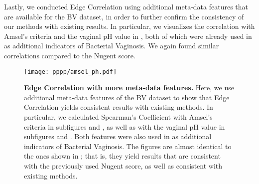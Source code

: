 Lastly, we conducted Edge Correlation using additional meta-data features that are available for the \ac{BV} dataset,
in order to further confirm the consistency of our methods with existing results.
In particular, we visualizes the correlation with Amsel's criteria \cite{Amsel1983} and the vaginal pH value
in , both of which were already used in \cite{Srinivasan2012} as additional indicators of Bacterial Vaginosis.
We again found similar correlations compared to the Nugent score.


\begin{figure}[!hpbt]
    \centering
    \texttt{[image: pppp/amsel\_ph.pdf]}
    \begin{subfigure}{0pt}
        \label{fig:amsel_ph:sub:amsel_em}
    \end{subfigure}
    \begin{subfigure}{0pt}
        \label{fig:amsel_ph:sub:amsel_ei}
    \end{subfigure}
    \begin{subfigure}{0pt}
        \label{fig:amsel_ph:sub:ph_em}
    \end{subfigure}
    \begin{subfigure}{0pt}
        \label{fig:amsel_ph:sub:ph_ei}
    \end{subfigure}
    \caption[Edge Correlation with more meta-data features]{
        \textbf{Edge Correlation with more meta-data features.}
        Here, we use additional meta-data features of the \ac{BV} dataset
        to show that Edge Correlation yields consistent results with existing methods.
        In particular, we calculated Spearman's Coefficient with Amsel's criteria \cite{Amsel1983}
        in subfigures  and ,
        as well as with the vaginal pH value
        in subfigures  and .
        Both features were also used in \cite{Srinivasan2012} as additional indicators of Bacterial Vaginosis.
        The figures are almost identical to the ones shown in ;
        that is, they yield results that are consistent with the previously used Nugent score,
        as well as consistent with existing methods.
    }
    \label{fig:amsel_ph}
\end{figure}

